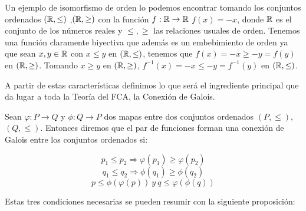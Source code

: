 \documentclass[oneside,openright,titlepage,numbers=noenddot,openany,headinclude,footinclude=true,
cleardoublepage=empty,abstractoff,BCOR=5mm,paper=a4,fontsize=12pt,main=spanish]{scrreprt}
\begin{document}
\begin{exampleth}
Un ejemplo de isomorfismo de orden lo podemos encontrar tomando los conjuntos ordenados $(\mathbb{R},\leq)$ ,$(\mathbb{R},\geq)$ con la función $f: \mathbb{R} \to \mathbb{R}$ $f(x)=-x$, donde $\mathbb{R}$ es el conjunto de los números reales y $\leq,\geq$ las relaciones usuales de orden. Tenemos una función claramente biyectiva que además es un embebimiento de orden ya que sean $x,y \in \mathbb{R}$ con $x \leq y$ en $(\mathbb{R},\leq)$, tenemos que $f(x)=-x \geq -y=f(y)$ en  $(\mathbb{R},\geq)$. Tomando $x \geq y$ en $(\mathbb{R},\geq)$, $f^{-1}(x)=-x\leq -y=f^{-1}(y)$ en $(\mathbb{R},\leq)$.
\end{exampleth}

A partir de estas características definimos lo que será el ingrediente principal que da lugar a toda la Teoría del FCA, la Conexión de Galois.

\begin{definition}\label{defGal}
Sean $\varphi : P \rightarrow Q $ y $ \phi: Q \rightarrow P$ dos mapas entre dos conjuntos ordenados $(P,\leq)$, $(Q,\leq)$. Entonces diremos que el par de funciones forman una conexión de Galois entre los conjuntos ordenados si:

\begin{equation}\label{gal1}
 p_{1} \leq p_{2} \Longrightarrow \varphi (p_{1}) \geq \varphi (p_{2})
\end{equation}
\begin{equation}\label{gal2}
     q_{1} \leq q_{2} \Longrightarrow \phi (q_{1}) \geq \phi (q_{2})
\end{equation}
\begin{equation}\label{gal3}
     p \leq \phi (\varphi (p)) \ y \ q\leq \varphi (\phi (q))
\end{equation}
    

\end{definition}

Estas tres condiciones necesarias se pueden resumir con la siguiente proposición: 
\end{document}
